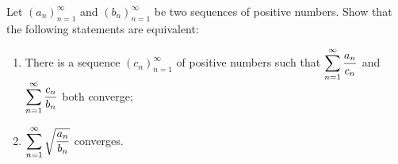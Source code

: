 \documentclass{article}
\begin{document}
\setlength{\parindent}{0pt}
Let \(\displaystyle (a_n)_{n=1}^{\infty}\) and \(\displaystyle (b_n)_{n=1}^{\infty}\) be two   sequences of positive numbers. Show that the following statements are equivalent:
\begin{enumerate}[label=(\arabic*)]
\item There is a sequence \(\displaystyle (c_n)_{n=1}^{\infty}\) of positive numbers such that \(\displaystyle \displaystyle\sum\limits_{n=1}^{\infty} \dfrac{a_n}{c_n}\) and \(\displaystyle \displaystyle\sum\limits_{n=1}^{\infty} \dfrac{c_n}{b_n}\) both converge;
\item \(\displaystyle \displaystyle\sum\limits_{n=1}^{\infty} \sqrt{\dfrac{a_n}{b_n}}\) converges. 
\end{enumerate}
\end{document}
